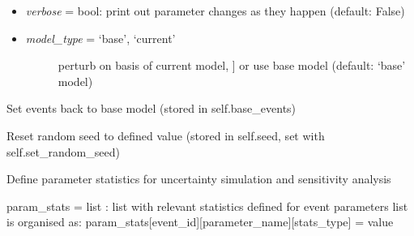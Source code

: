 \documentclass[a4paper,10pt,english]{sphinxmanual}
\begin{document}
\begin{fulllineitems}
\begin{fulllineitems}
\begin{description}
\begin{itemize}
\item {} 
\emph{verbose} = bool: print out parameter changes as they happen (default: False)

\item {} \begin{description}
\item[{\emph{model\_type} = `base', `current'}] \leavevmode{[}perturb on basis of current model, {]}
or use base model (default: `base' model)

\end{description}

\end{itemize}

\end{description}

\end{fulllineitems}


\begin{fulllineitems}
\label{pynoddy:pynoddy.experiment.Experiment.reset_base}
Set events back to base model (stored in self.base\_events)

\end{fulllineitems}


\begin{fulllineitems}
\label{pynoddy:pynoddy.experiment.Experiment.reset_random_seed}
Reset random seed to defined value (stored in self.seed, set with self.set\_random\_seed)

\end{fulllineitems}


\begin{fulllineitems}
\label{pynoddy:pynoddy.experiment.Experiment.set_parameter_statistics}
Define parameter statistics for uncertainty simulation and sensitivity analysis

param\_stats = list : list with relevant statistics defined for event parameters
list is organised as:
param\_stats{[}event\_id{]}{[}parameter\_name{]}{[}stats\_type{]} = value


\end{fulllineitems}
\end{fulllineitems}
\end{document}
